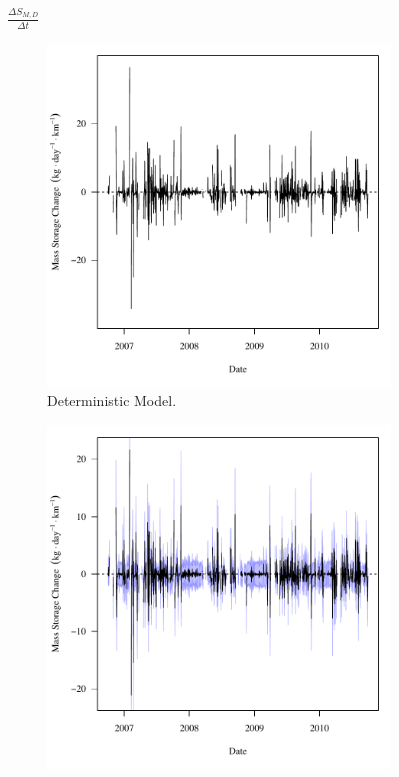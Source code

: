 \begin{linenumbers}
\subfiguremid
\begin{landscape}
	\begin{figure}
		$ \displaystyle \frac{\Delta S_{M,D}}{\Delta t} $
		\begin{subfigure}{0.7\textwidth}
			\centering
			\includegraphics[width=\tableCustomSize]{"Figures/Results_USR/Deterministic/f Segment D"}
			\caption{Deterministic Model.}
		\end{subfigure}%
		\begin{subfigure}{0.7\textwidth}
			\centering
			\includegraphics[width=\tableCustomSize]{"Figures/Results_USR/Stochastic/f Segment D"}

\end{subfigure}
\end{figure}
\end{landscape}
\end{linenumbers}
